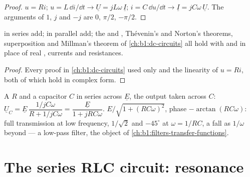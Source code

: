 \begin{proof}
$u = Ri$; $u = L\,\dd i/\dd t \to \underline U = jL\omega\,\underline I$;
$i = C\,\dd u/\dd t \to \underline I = jC\omega\,\underline U$. The
arguments of $1$, $j$ and $-j$ are $0$, $\pi/2$, $-\pi/2$.
\end{proof}

\begin{proposition}\label{prop:b1:sinusoidal-impedance:assoc}
 in series add;  in parallel add; the  and
, Thévenin's and Norton's theorems, superposition and
Millman's theorem of \cref{ch:b1:dc-circuits} all hold with  and  in place of real , currents and
resistances.
\end{proposition}

\begin{proof}
Every proof in \cref{ch:b1:dc-circuits} used only  and
the linearity of $u = Ri$, both of which hold in complex form.
\end{proof}

\begin{example}\label{ex:b1:sinusoidal-impedance:rcdivider}
A  $R$ and a capacitor $C$ in series across $\underline E$, the
output taken across $C$: $\underline U_C = \underline E\,\dfrac{1/jC\omega}
{R + 1/jC\omega} = \dfrac{\underline E}{1 + jRC\omega}$. 
$E/\sqrt{1 + (RC\omega)^2}$, phase $-\arctan(RC\omega)$: full
transmission at low frequency, $1/\sqrt2$ and $-45^\circ$ at
$\omega = 1/RC$, a fall as $1/\omega$ beyond --- a low-pass filter, the
object of \cref{ch:b1:filters-transfer-functions}.
\end{example}

\section{The series RLC circuit: resonance}

